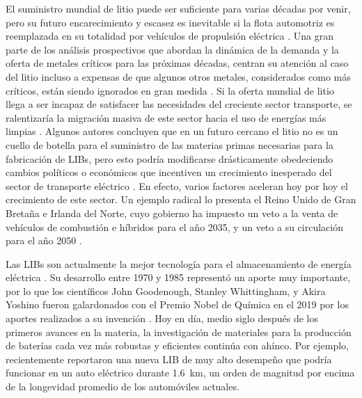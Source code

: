El suministro mundial de litio puede ser suficiente para varias décadas por venir, pero su futuro encarecimiento y escasez es inevitable si la flota automotriz es reemplazada en su totalidad por vehículos de propulsión eléctrica \citep{SVERDRUP2016}. Una gran parte de los análisis prospectivos que abordan la dinámica de la demanda y la oferta de metales críticos para las próximas décadas, centran su atención al caso del litio incluso a expensas de que algunos otros metales, considerados como más críticos, están siendo ignorados en gran medida \citep{Watari2020}. Si la oferta mundial de litio llega a ser incapaz de satisfacer las necesidades del creciente sector transporte, se ralentizaría la migración masiva de este sector hacia el uso de energías más limpias \citep{VIKSTROM2013}. Algunos autores concluyen que en un futuro cercano el litio no es un cuello de botella para el suministro de las materias primas necesarias para la fabricación de \acp{LIB}, pero esto podría modificarse drásticamente obedeciendo cambios políticos o económicos que incentiven un crecimiento inesperado del sector de transporte eléctrico \citep{Olivetti2017}. En efecto, varios factores aceleran hoy por hoy el crecimiento de este sector. Un ejemplo radical lo presenta el Reino Unido de Gran Bretaña e Irlanda del Norte, cuyo gobierno ha impuesto un veto a la venta de vehículos de combustión e híbridos para el año 2035, y un veto a su circulación para el año 2050 \citep{BBC2020}.

Las \acp{LIB} son actualmente la mejor tecnología para el almacenamiento de energía eléctrica \citep{Zubi2018}. Su desarrollo entre 1970 y 1985 representó un aporte muy importante, por lo que los científicos John Goodenough, Stanley Whittingham, y Akira Yoshino fueron galardonados con el Premio Nobel de Química en el 2019 por los aportes realizados a su invención \citep{Royal2019}. Hoy en día, medio siglo después de los primeros avances en la materia, la investigación de materiales para la producción de baterías cada vez más robustas y eficientes continúa con ahínco. Por ejemplo, recientemente \citet{Harlow2019} reportaron una nueva \ac{LIB} de muy alto desempeño que podría funcionar en un auto eléctrico durante 1.6~km, un orden de magnitud por encima de la longevidad promedio de los automóviles actuales.%

